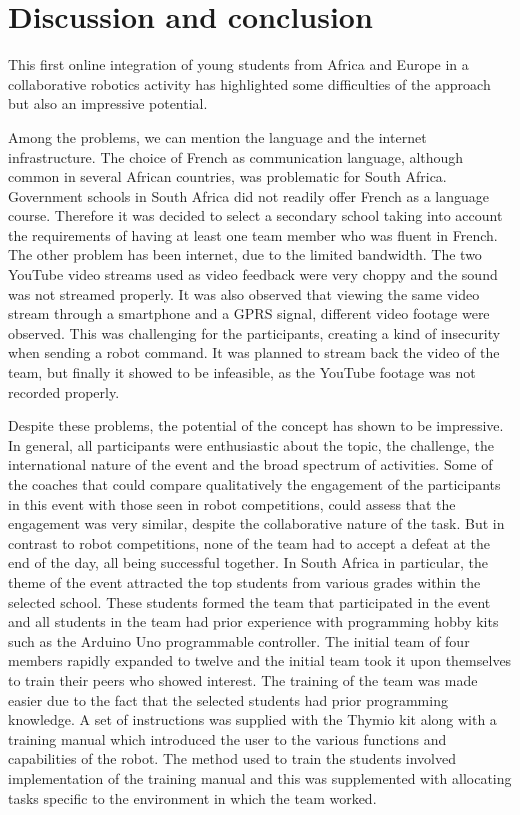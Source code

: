 \documentclass{intech-journal}
\begin{document}
\section{Discussion and conclusion}

This first online integration of young students from Africa and Europe in a collaborative robotics activity has highlighted some difficulties of the approach but also an impressive potential.

Among the problems, we can mention the language and the internet infrastructure.
The choice of French as communication language, although common in several African countries, was problematic for South Africa.
Government schools in South Africa did not readily offer French as a language course.
Therefore it was decided to select a secondary school taking into account the requirements of having at least one team member who was fluent in French. 
The other problem has been internet, due to the limited bandwidth. 
The two YouTube video streams used as video feedback were very choppy and the sound was not streamed properly.
It was also observed that viewing the same video stream through a smartphone and a GPRS signal, different video footage were observed. 
This was challenging for the participants, creating a kind of insecurity when sending a robot command.
It was planned to stream back the video of the team, but finally it showed to be infeasible, as the YouTube footage was not recorded properly.

Despite these problems, the potential of the concept has shown to be impressive.
In general, all participants were enthusiastic about the topic, the challenge, the international nature of the event and the broad spectrum of activities. 
Some of the coaches that could compare qualitatively the engagement of the participants in this event with those seen in robot competitions, could assess that the engagement was very similar, despite the collaborative nature of the task. 
But in contrast to robot competitions, none of the team had to accept a defeat at the end of the day, all being successful together. 
In South Africa in particular, the theme of the event attracted the top students from various grades within the selected school. 
These students formed the team that participated in the event and all students in the team had prior experience with programming hobby kits such as the Arduino Uno programmable controller. 
The initial team of four members rapidly expanded to twelve and the initial team took it upon themselves to train their peers who showed interest. 
The training of the team was made easier due to the fact that the selected students had prior programming knowledge. 
A set of instructions was supplied with the Thymio kit along with a training manual which introduced the user to the various functions and capabilities of the robot. 
The method used to train the students involved implementation of the training manual and this was supplemented with allocating tasks specific to the environment in which the team worked. 
\end{document}
